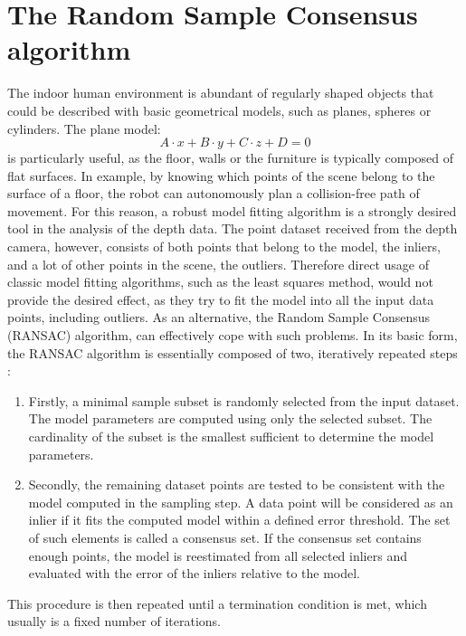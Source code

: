 \section{The Random Sample Consensus algorithm}
\label{sec:ransac}
The indoor human environment is abundant of regularly shaped objects that could be described with basic geometrical models, such as planes, spheres or cylinders. The plane model:
\begin{equation}
A \cdot x+ B \cdot y+ C \cdot z+ D= 0
\label{eq:planemodel}
\end{equation}
is particularly useful, as the floor, walls or the furniture is typically composed of flat surfaces. In example, by knowing which points of the scene belong to the surface of a floor, the robot can autonomously plan a collision-free path of movement. For this reason, a robust model fitting algorithm is a strongly desired tool in the analysis of the depth data. The point dataset received from the depth camera, however, consists of both points that belong to the model, the inliers, and a lot of other points in the scene, the outliers. Therefore direct usage of classic model fitting algorithms, such as the least squares method, would not provide the desired effect, as they try to fit the model into all the input data points, including outliers. As an alternative, the Random Sample Consensus (RANSAC) algorithm, can effectively cope with such problems. In its basic form, the RANSAC algorithm is essentially composed of two, iteratively repeated steps \cite{ransacwiki,ransacdummies}:
\begin{enumerate}
\item Firstly, a minimal sample subset is randomly selected from the input dataset. The model parameters are computed using only the selected subset. The cardinality of the subset is the smallest sufficient to determine the model parameters.
\item Secondly, the remaining dataset points are tested to be consistent with the model computed in the sampling step. A data point will be considered as an inlier if it fits the computed model within a defined error threshold. The set of such elements is called a consensus set. If the consensus set contains enough points, the model is reestimated from all selected inliers and evaluated with the error of the inliers relative to the model.
\end{enumerate}
This procedure is then repeated until a termination condition is met, which usually is a fixed number of iterations.
